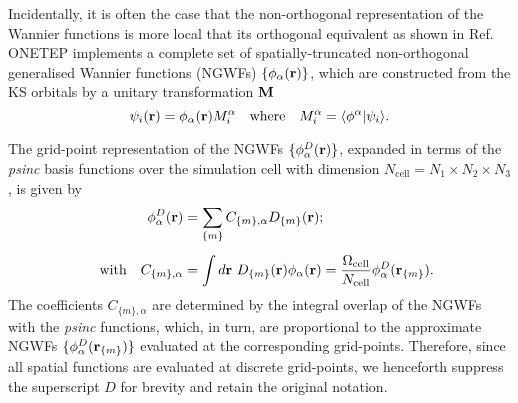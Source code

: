 {
Incidentally, it is often the case that 
the non-orthogonal representation of
the Wannier functions is more local  
that its orthogonal equivalent as 
shown in Ref.~\cite{doi:10.1080/00268976.2016.1173733}
%
%
{\sc ONETEP} implements a complete set 
of spatially-truncated non-orthogonal 
generalised Wannier functions (NGWFs) 
$\{\phi_\alpha({\bf r})\}$,
which are constructed from the 
KS orbitals by a unitary 
transformation ${\bf M}$
%
\begin{equation}
\psi_{i}({\bf r})=\phi_{\alpha}({\bf r})M_i^\alpha
\quad\mbox{where}\quad
M_i^\alpha=\langle\phi^\alpha\vert\psi_i\rangle.
\label{eq:NGWF1}
\end{equation}}
%

{
The grid-point representation 
of the NGWFs $\{\phi_\alpha^D({\bf r})\}$, 
expanded in terms of the 
{\it psinc} basis functions 
over the simulation cell with dimension 
$N_\textrm{cell}=N_1\times N_2\times N_3$, 
is given by 
%
\begin{align}
\phi_\alpha^D({\bf r})&=\sum_{\{m\}}C_{\{m\},\alpha}D_{\{m\}}({\bf r});
\nonumber\\[0.5em]
\quad\mbox{with}\quad
C_{\{m\},\alpha}&=\int d{\bf r}\ D_{\{m\}}({\bf r})\phi_\alpha({\bf r})
=\frac{\Omega_\textrm{cell}}{N_\textrm{cell}}\phi^D_\alpha({\bf r}_{\{m\}}).
\label{eq:support_functions}
\end{align}
%
The coefficients $C_{\{m\},\alpha}$
are determined by the integral 
overlap of the NGWFs with the {\it psinc} functions, 
which, in turn, are proportional to the 
approximate NGWFs $\{\phi^D_\alpha({\bf r}_{\{m\}})\}$
evaluated at the corresponding grid-points.
%
Therefore, since all spatial functions 
are evaluated at discrete grid-points, 
we henceforth suppress the superscript $D$
for brevity and retain the original notation.}


